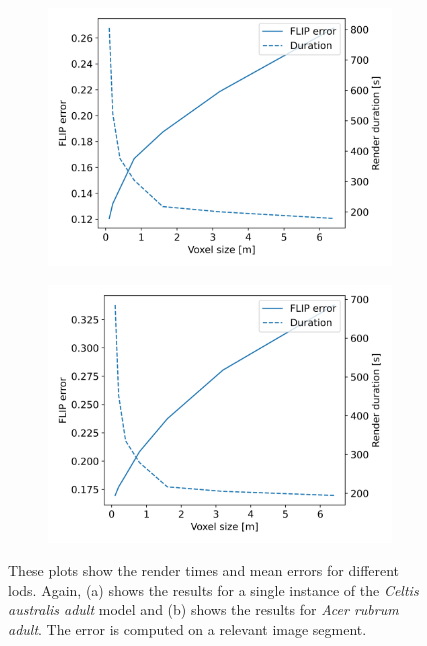 \begin{figure}[t]
    \centering
    \begin{subfigure}[b]{0.49\linewidth}
        \centering
        \includegraphics[width=1\linewidth]{img/results/performance_quality_EU06a.png}
        \caption{}
    \end{subfigure}
    \begin{subfigure}[b]{0.49\linewidth}
        \centering
        \includegraphics[width=1\linewidth]{img/results/performance_quality_EA01a.png}
        \caption{}
    \end{subfigure}
	\caption[Plots of \FLIP error and render times for different \acsp{lod}]{These plots show the render times and mean \FLIP errors for different \acsp{lod}. Again, (a) shows the results for a single instance of the \textit{Celtis australis adult} model and (b) shows the results for \textit{Acer rubrum adult}. The \FLIP error is computed on a relevant image segment.}
	\label{fig:performance_quality}
\end{figure}
